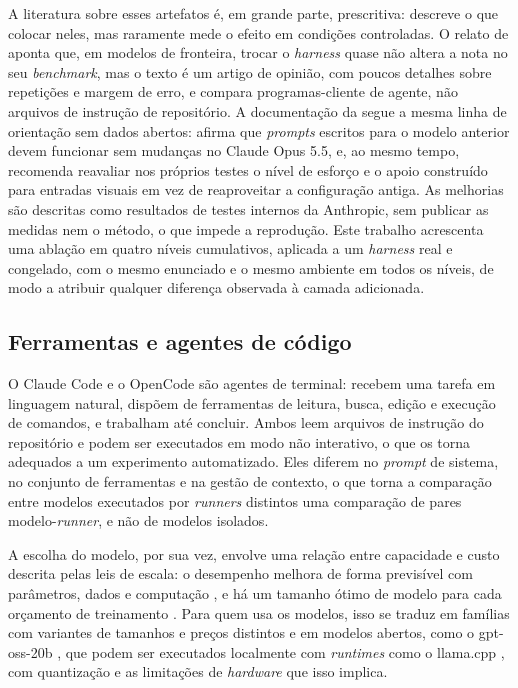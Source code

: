 A literatura sobre esses artefatos é, em grande parte, prescritiva: descreve o
que colocar neles, mas raramente mede o efeito em condições controladas. O relato de
 aponta que, em modelos de fronteira, trocar o
\textit{harness} quase não altera a nota no seu \textit{benchmark}, mas o texto
é um artigo de opinião, com poucos detalhes sobre repetições e margem de erro, e
compara programas-cliente de agente, não arquivos de instrução de repositório. A
documentação da  segue a mesma linha
de orientação sem dados abertos: afirma que \textit{prompts} escritos para o
modelo anterior devem funcionar sem mudanças no Claude Opus 5.5, e, ao mesmo
tempo, recomenda reavaliar nos próprios testes o nível de esforço e o apoio
construído para entradas visuais em vez de reaproveitar a configuração antiga.
As melhorias são descritas como resultados de testes internos da Anthropic, sem
publicar as medidas nem o método, o que impede a reprodução. Este trabalho acrescenta uma ablação em quatro níveis
cumulativos, aplicada a um \textit{harness} real e congelado, com o mesmo
enunciado e o mesmo ambiente em todos os níveis, de modo a atribuir qualquer
diferença observada à camada adicionada.

\subsection{Ferramentas e agentes de código}
\label{sec:ref-ferramentas}

O Claude Code \cite{anthropic2025claudecode} e o OpenCode
\cite{opencode2025docs} são agentes de terminal: recebem uma tarefa em
linguagem natural, dispõem de ferramentas de leitura, busca, edição e execução
de comandos, e trabalham até concluir. Ambos leem arquivos de instrução do
repositório e podem ser executados em modo não interativo, o que os torna
adequados a um experimento automatizado. Eles diferem no \textit{prompt} de
sistema, no conjunto de ferramentas e na gestão de contexto, o que torna a
comparação entre modelos executados por \textit{runners} distintos uma
comparação de pares modelo-\textit{runner}, e não de modelos isolados.

A escolha do modelo, por sua vez, envolve uma relação entre capacidade e
custo descrita pelas leis de escala: o desempenho melhora de forma previsível
com parâmetros, dados e computação \cite{kaplan2020scaling}, e há um tamanho
ótimo de modelo para cada orçamento de treinamento \cite{hoffmann2022chinchilla}.
Para quem usa os modelos, isso se traduz em famílias com variantes de tamanhos e
preços distintos e em modelos abertos, como o gpt-oss-20b
\cite{openai2025gptoss}, que podem ser executados localmente com
\textit{runtimes} como o llama.cpp \cite{llamacpp2025}, com quantização e as
limitações de \textit{hardware} que isso implica.

